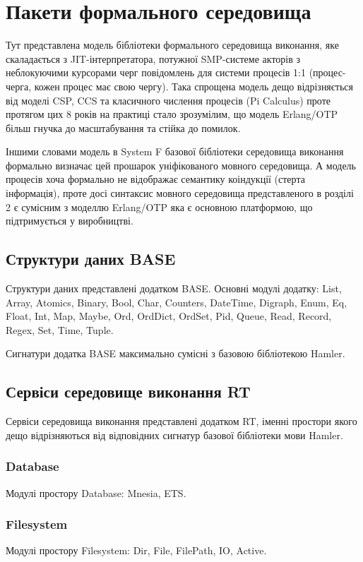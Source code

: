 \section{Пакети формального середовища}
Тут представлена модель бібліотеки формального середовища виконання, яке
скаладається з JIT-інтерпретатора, потужної SMP-системе акторів з неблокуючими
курсорами черг повідомлень для системи процесів 1:1 (процес-черга, кожен процес
має свою чергу). Така спрощена модель дещо відрізняється від моделі CSP, CCS
та класичного числення процесів (Pi Calculus) проте протягом цих 8 років на практиці
стало зрозумілим, що модель Erlang/OTP більш гнучка до масштабування та стійка до помилок.

Іншими словами модель в System F базової бібліотеки
середовища виконання формально визначає цей прошарок уніфікованого мовного середовища.
А модель процесів хоча формально не відображає семантику коіндукції (стерта інформація),
проте досі синтаксис мовного середовища представленого в розділі 2 є сумісним з моделлю
Erlang/OTP яка є основною платформою, що підтримується у виробництві.

\subsection{Структури даних BASE}
Структури даних представлені додатком BASE. Основні модулі додатку:
List, Array, Atomics, Binary, Bool, Char, Counters, DateTime, Digraph,
Enum, Eq, Float, Int, Map, Maybe, Ord, OrdDict, OrdSet, Pid, Queue,
Read, Record, Regex, Set, Time, Tuple.

Сигнатури додатка BASE максимально сумісні з базовою бібліотекою Hamler.

\subsection{Сервіси середовище виконання RT}
Сервіси середовища виконання представлені додатком RT, іменні простори якого
дещо відрізняються від відповідних сигнатур базової бібліотеки мови Hamler.

\subsubsection{Database}
Модулі простору Database: Mnesia, ETS.

\subsubsection{Filesystem}
Модулі простору Filesystem: Dir, File, FilePath, IO, Active.

